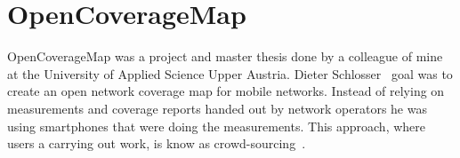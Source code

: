 \documentclass[master,english]{hgbthesis}
\begin{document}
\section{OpenCoverageMap}
OpenCoverageMap was a project and master thesis done by a colleague of mine at the University of Applied Science Upper Austria. Dieter Schlosser~\cite{Schlosser2012} goal was to create an open network coverage map for mobile networks. Instead of relying on measurements and coverage reports handed out by network operators he was using smartphones that were doing the measurements. This approach, where users a carrying out work, is know as crowd-sourcing~\cite{Surowiecki2004}.
\end{document}
